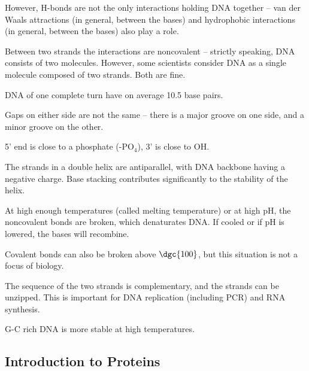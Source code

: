 \documentclass[11pt]{scrartcl}
\begin{document}
However, H-bonds are not the only interactions holding DNA together --
van der Waals attractions (in general, between the bases) and
hydrophobic interactions (in general, between the bases) also play a
role.

Between two strands the interactions are noncovalent -- strictly
speaking, DNA consists of two molecules. However, some scientists
consider DNA as a single molecule composed of two strands. Both are
fine.


DNA of one complete turn have on average 10.5 base pairs.

Gaps on either side are not the same -- there is a major groove on one
side, and a minor groove on the other.

5' end is close to a phosphate (-PO$_{4}$), 3' is close to OH.

The strands in a double helix are antiparallel, with DNΑ backbone
having a negative charge. Base stacking contributes significantly to
the stability of the helix.

At high enough temperatures (called melting temperature) or at high
pH, the noncovalent bonds are broken, which denaturates DNA. If cooled
or if pH is lowered, the bases will recombine.

Covalent bonds can also be broken above $\dgc{100}$, but this situation
is not a focus of biology.

The sequence of the two strands is complementary, and the strands can
be unzipped. This is important for DNA replication (including PCR) and
RNΑ synthesis.

G-C rich DNA is more stable at high temperatures.

\subsection{Introduction to Proteins}
\end{document}
